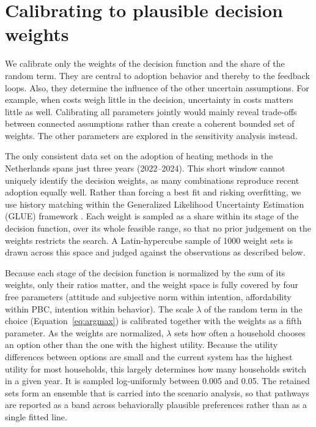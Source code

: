 \documentclass[preprint,12pt,authoryear]{elsarticle}
\begin{document}
\section{Calibrating to plausible decision weights}
\label{sec:calibrating}
We calibrate only the weights of the decision function and the share of the 
random term. They are central to
adoption behavior and thereby to the feedback loops. Also, they determine the
influence of the other uncertain assumptions. For example, when costs weigh little in the
decision, uncertainty in costs matters little as well. Calibrating all
parameters jointly would mainly reveal trade-offs between connected
assumptions rather than create a coherent bounded set of weights. The other 
parameters are explored in the sensitivity analysis instead.

The only consistent data set on the adoption of heating methods in the
Netherlands spans just three years (2022--2024). This short window cannot
uniquely identify the decision weights, as many combinations reproduce recent
adoption equally well. Rather than forcing a best fit and risking
overfitting, we use history matching within the Generalized Likelihood
Uncertainty Estimation (GLUE) framework \citep{beven_future_2006}. 
Each weight is sampled as a share within its stage of the decision
function, over its whole feasible range, so
that no prior judgement on the weights restricts the search. A
Latin-hypercube sample of 1000 weight sets is drawn across this space and
judged against the observations as described below.

Because each stage of the decision function is normalized by the sum of its
weights, only their ratios matter, and the weight space is fully covered by
four free parameters (attitude and subjective norm within intention,
affordability within PBC, intention within behavior). The scale $\lambda$ 
of the random term in the choice
(Equation~\ref{eq:argmax}) is calibrated together with the weights as a
fifth parameter. As the weights are normalized, $\lambda$ sets how often a
household chooses an option other than the one with the highest utility.
Because the utility differences between options are small and the current
system has the highest utility for most households, this largely determines
how many households switch in a given year.
It is sampled log-uniformly between 0.005 and 0.05. 
The retained sets form an ensemble that is carried into the
scenario analysis, so that pathways are reported as a band across
behaviorally plausible preferences rather than as a single fitted line.
\end{document}
